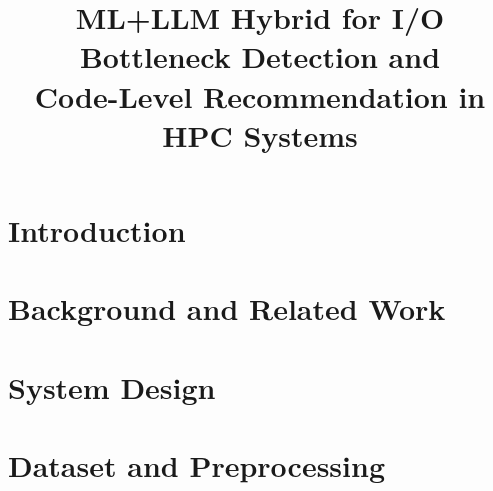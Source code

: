 \documentclass[conference]{IEEEtran}
\begin{document}
\title{ML+LLM Hybrid for I/O Bottleneck Detection and \\
Code-Level Recommendation in HPC Systems}

\author{}

\maketitle

\begin{abstract}

\end{abstract}

\section{Introduction}
\label{sec:intro}


\section{Background and Related Work}
\label{sec:related}


\section{System Design}
\label{sec:design}


\section{Dataset and Preprocessing}
\label{sec:dataset}

\end{document}
